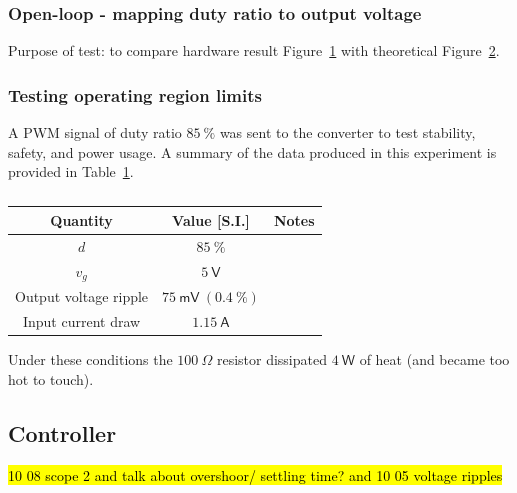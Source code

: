 \subsubsection{Open-loop - mapping duty ratio to output voltage}
\begin{figure}[H]
\centering
{}
\caption{}
\label{fig:steps}
\end{figure}
Purpose of test: to compare hardware result Figure~\ref{fig:steps} with theoretical Figure~\ref{fig:out_parasitic}.
\begin{figure}[H]
\centering
{}
\caption{}
\label{fig:out_parasitic}
\end{figure}
\subsubsection{Testing operating region limits}
A PWM signal of duty ratio $85 \ \mathsf{\%}$ was sent to the converter to test stability, safety, and power usage. A summary of the data produced in this experiment is provided in Table~\ref{tab:heating}.
\begin{table}[H]
    \centering
    \begin{tabular}{|c|c|c|}
    \hline
    Quantity & Value [S.I.] & Notes\\
    \hline
    $d$ & $85 \ \mathsf{\%}$ &\\
    \hline
    $v_g$ & $5 \ \mathsf{V}$ &\\
    \hline
    Output voltage ripple & $75 \ \mathsf{mV} \ (0.4 \ \mathsf{\%})$ &\\
    \hline
    Input current draw & $1.15 \ \mathsf{A}$&\\
    \hline
    \end{tabular}
    \caption{}
    \label{tab:heating}
\end{table}
Under these conditions the $100 \ \mathsf{\Omega}$ resistor dissipated $4 \ \mathsf{W}$ of heat (and became too hot to touch).
\subsection{Controller}

\hl{10 08 scope 2 and talk about overshoor/ settling time? and 10 05 voltage ripples }

